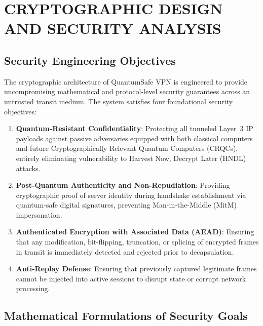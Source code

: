 
\chapter{CRYPTOGRAPHIC DESIGN AND SECURITY ANALYSIS}
\label{chap:security_analysis}

\section{Security Engineering Objectives}
\label{sec:security_objectives}

The cryptographic architecture of QuantumSafe VPN is engineered to provide uncompromising mathematical and protocol-level security guarantees across an untrusted transit medium. The system satisfies four foundational security objectives:

\begin{enumerate}
    \item \textbf{Quantum-Resistant Confidentiality}: Protecting all tunneled Layer~3 IP payloads against passive adversaries equipped with both classical computers and future Cryptographically Relevant Quantum Computers (CRQCs), entirely eliminating vulnerability to Harvest Now, Decrypt Later (HNDL) attacks.
    \item \textbf{Post-Quantum Authenticity and Non-Repudiation}: Providing cryptographic proof of server identity during handshake establishment via quantum-safe digital signatures, preventing Man-in-the-Middle (MitM) impersonation.
    \item \textbf{Authenticated Encryption with Associated Data (AEAD)}: Ensuring that any modification, bit-flipping, truncation, or splicing of encrypted frames in transit is immediately detected and rejected prior to decapsulation.
    \item \textbf{Anti-Replay Defense}: Ensuring that previously captured legitimate frames cannot be injected into active sessions to disrupt state or corrupt network processing.
\end{enumerate}

\section{Mathematical Formulations of Security Goals}
\label{sec:math_formulations_security}

